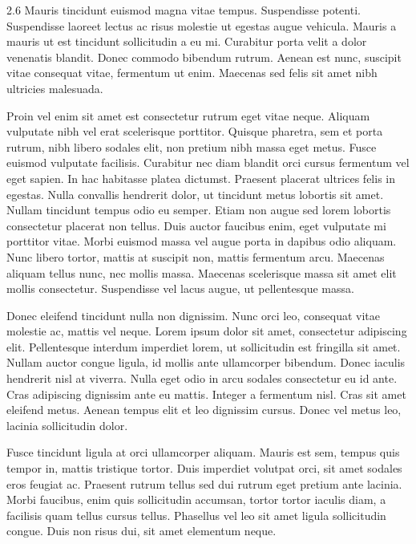 \documentclass[a0]{a0poster}
\begin{document}
\framethin
\begin{area3}{2.6}
Mauris tincidunt euismod magna vitae tempus. Suspendisse potenti. Suspendisse laoreet lectus ac risus molestie ut egestas augue vehicula. Mauris a mauris ut est tincidunt sollicitudin a eu mi. Curabitur porta velit a dolor venenatis blandit. Donec commodo bibendum rutrum. Aenean est nunc, suscipit vitae consequat vitae, fermentum ut enim. Maecenas sed felis sit amet nibh ultricies malesuada.

Proin vel enim sit amet est consectetur rutrum eget vitae neque. Aliquam vulputate nibh vel erat scelerisque porttitor. Quisque pharetra, sem et porta rutrum, nibh libero sodales elit, non pretium nibh massa eget metus. Fusce euismod vulputate facilisis. Curabitur nec diam blandit orci cursus fermentum vel eget sapien. In hac habitasse platea dictumst. Praesent placerat ultrices felis in egestas. Nulla convallis hendrerit dolor, ut tincidunt metus lobortis sit amet. Nullam tincidunt tempus odio eu semper. Etiam non augue sed lorem lobortis consectetur placerat non tellus. Duis auctor faucibus enim, eget vulputate mi porttitor vitae. Morbi euismod massa vel augue porta in dapibus odio aliquam. Nunc libero tortor, mattis at suscipit non, mattis fermentum arcu. Maecenas aliquam tellus nunc, nec mollis massa. Maecenas scelerisque massa sit amet elit mollis consectetur. Suspendisse vel lacus augue, ut pellentesque massa.

Donec eleifend tincidunt nulla non dignissim. Nunc orci leo, consequat vitae molestie ac, mattis vel neque. Lorem ipsum dolor sit amet, consectetur adipiscing elit. Pellentesque interdum imperdiet lorem, ut sollicitudin est fringilla sit amet. Nullam auctor congue ligula, id mollis ante ullamcorper bibendum. Donec iaculis hendrerit nisl at viverra. Nulla eget odio in arcu sodales consectetur eu id ante. Cras adipiscing dignissim ante eu mattis. Integer a fermentum nisl. Cras sit amet eleifend metus. Aenean tempus elit et leo dignissim cursus. Donec vel metus leo, lacinia sollicitudin dolor.

Fusce tincidunt ligula at orci ullamcorper aliquam. Mauris est sem, tempus quis tempor in, mattis tristique tortor. Duis imperdiet volutpat orci, sit amet sodales eros feugiat ac. Praesent rutrum tellus sed dui rutrum eget pretium ante lacinia. Morbi faucibus, enim quis sollicitudin accumsan, tortor tortor iaculis diam, a facilisis quam tellus cursus tellus. Phasellus vel leo sit amet ligula sollicitudin congue. Duis non risus dui, sit amet elementum neque.


\end{area3}
\end{document}
